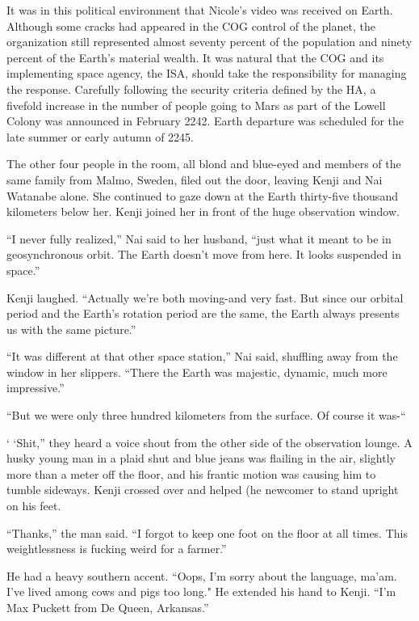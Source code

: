 \documentclass[]{article}
\begin{document}
{It was in this political environment that Nicole’s video was received on Earth.  Although some cracks had appeared in the COG control of the planet, the organization still represented almost seventy percent of the population and ninety percent of the Earth’s material wealth.  It was natural that the COG and its implementing space agency, the ISA, should take the responsibility for managing the response.  Carefully following the security criteria defined by the HA, a fivefold increase in the number of people going to Mars as part of the Lowell Colony was announced in February 2242.  Earth departure was scheduled for the late summer or early autumn of 2245.

The other four people in the room, all blond and blue-eyed and members of the same family from Malmo, Sweden, filed out the door, leaving Kenji and Nai Watanabe alone.  She continued to gaze down at the Earth thirty-five thousand kilometers below her.  Kenji joined her in front of the huge observation window.

“I never fully realized,” Nai said to her husband, “just what it meant to be in geosynchronous orbit.  The Earth doesn’t move from here.  It looks suspended in space.”

Kenji laughed.  “Actually we’re both moving-and very fast.  But since our orbital period and the Earth’s rotation period are the same, the Earth always presents us with the same picture.”

“It was different at that other space station,” Nai said, shuffling away from the window in her slippers.  “There the Earth was majestic, dynamic, much more impressive.”

“But we were only three hundred kilometers from the surface.  Of course it was-“

‘ ‘Shit,” they heard a voice shout from the other side of the observation lounge.  A husky young man in a plaid shut and blue jeans was flailing in the air, slightly more than a meter off the floor, and his frantic motion was causing him to tumble sideways.  Kenji crossed over and helped (he newcomer to stand upright on his feet.

“Thanks,” the man said.  “I forgot to keep one foot on the floor at all times.  This weightlessness is fucking weird for a farmer.”

He had a heavy southern accent.  “Oops, I’m sorry about the language, ma’am.  I’ve lived among cows and pigs too long."  He extended his hand to Kenji.  “I’m Max Puckett from De Queen, Arkansas.”

}
\end{document}
